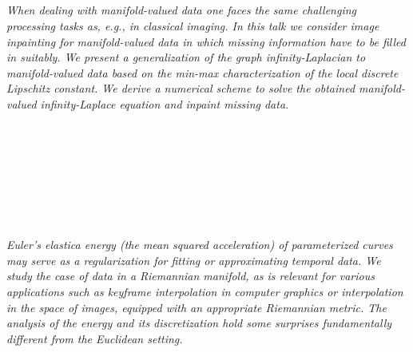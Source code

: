 \begin{multicols}{2}
        \\\\
        \\
        \\\\
        \\
        \\\\
\\
      \textit{When dealing with manifold-valued data one faces the same challenging
processing tasks as, e.g., in classical imaging.
In this talk we consider image inpainting for manifold-valued data in which
missing information have to be filled in suitably. We present a generalization
of the graph infinity-Laplacian to manifold-valued data based on the
min-max characterization of the local discrete Lipschitz constant. We derive a
numerical scheme to solve the obtained manifold-valued infinity-Laplace equation
and inpaint missing data.}\\
\\ 
        \\
        \\\\
        \\
        \\\\
\\
      \textit{Euler's elastica energy (the mean squared acceleration) of parameterized curves may serve as a regularization for fitting or approximating temporal data. We study the case of data in a Riemannian manifold, as is relevant for various applications such as keyframe interpolation in computer graphics or interpolation in the space of images, equipped with an appropriate Riemannian metric. The analysis of the energy and its discretization hold some surprises fundamentally different from the Euclidean setting.}\\
\\ 
        \\
        \\\\
        \\
        \\\\

\end{multicols}
